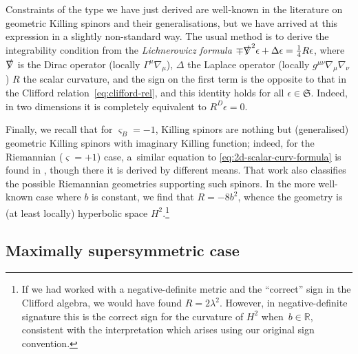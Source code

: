 \documentclass[pdftex]{sigma}
\numberwithin{equation}{section}
\newcommand{\fS}{\mathfrak{S}}
\newcommand{\RR}{\mathbb{R}}
\newcommand{\1}{\mathbbm{1}}
\begin{document}
Constraints of the type we have just derived are well-known in the literature on geometric Killing spinors and their generalisations, but we have arrived at this expression in a slightly non-standard way. The usual method is to derive the integrability condition from the \emph{Lichnerowicz formula} \cite{Hijazi2001,Lichnerowicz1963}
$\mp\slashed\nabla^2\epsilon + \Delta\epsilon = \frac{1}{4}R\epsilon$,
where $\slashed\nabla$ is the Dirac operator (locally $\Gamma^\mu\nabla_\mu$), $\Delta$ the Laplace operator (locally $g^{\mu\nu}\nabla_\mu\nabla_\nu$) $R$ the scalar curvature, and the sign on the first term is the opposite to that in the Clifford relation~\eqref{eq:clifford-rel}, and this identity holds for all $\epsilon\in\fS$. Indeed, in two dimensions it is completely equivalent to $R^D\epsilon=0$.

Finally, we recall that for $\varsigma_B=-1$, Killing spinors are nothing but (generalised) geometric Killing spinors with imaginary Killing function; indeed, for the Riemannian ($\varsigma=+1$) case, a~similar equation to \eqref{eq:2d-scalar-curv-formula} is found in \cite[equation~(5)]{Rademacher1990}, though there it is derived by different means. That work also classifies the possible Riemannian geometries supporting such spinors. In the more well-known case where $b$ is constant, we find that $R=-8b^2$, whence the geometry is (at least locally) hyperbolic space $H^2$.\footnote{If we had worked with a negative-definite metric and the ``correct'' sign in the Clifford algebra, we would have found $R=2\lambda^2$. However, in negative-definite signature this is the correct sign for the curvature of $H^2$ when~${b\in \RR}$, consistent with the interpretation which arises using our original sign convention.}

\subsection{Maximally supersymmetric case}
\end{document}
